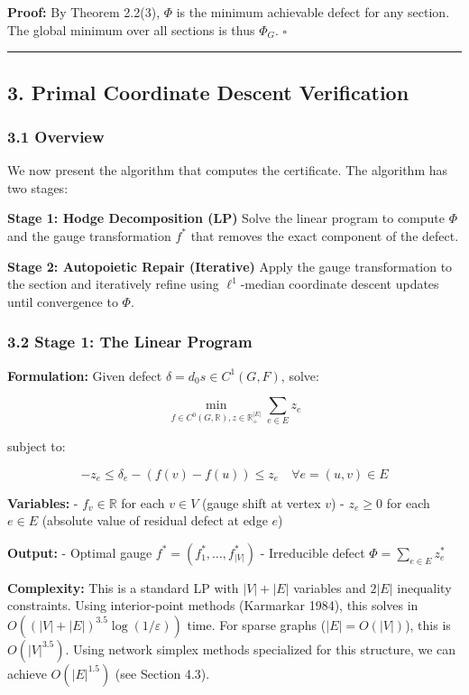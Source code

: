 \documentclass[
]{article}
\begin{document}
\textbf{Proof:} By Theorem 2.2(3), \(\Phi\) is the minimum achievable
defect for any section. The global minimum over all sections is thus
\(\Phi_G\). \(\square\)

\begin{center}\rule{0.5\linewidth}{0.5pt}\end{center}

\subsection{3. Primal Coordinate Descent
Verification}\label{primal-coordinate-descent-verification}

\subsubsection{3.1 Overview}\label{overview}

We now present the algorithm that computes the certificate. The
algorithm has two stages:

\textbf{Stage 1: Hodge Decomposition (LP)} Solve the linear program to
compute \(\Phi\) and the gauge transformation \(f^*\) that removes the
exact component of the defect.

\textbf{Stage 2: Autopoietic Repair (Iterative)} Apply the gauge
transformation to the section and iteratively refine using
\(\ell^1\)-median coordinate descent updates until convergence to
\(\Phi\).

\subsubsection{3.2 Stage 1: The Linear
Program}\label{stage-1-the-linear-program}

\textbf{Formulation:} Given defect \(\delta = d_0 s \in C^1(G, F)\),
solve:

\[\min_{f \in C^0(G, \mathbb{R}), z \in \mathbb{R}^{|E|}_+} \sum_{e \in E} z_e\]

subject to:

\[-z_e \leq \delta_e - (f(v) - f(u)) \leq z_e \quad \forall e = (u, v) \in E\]

\textbf{Variables:} - \(f_v \in \mathbb{R}\) for each \(v \in V\) (gauge
shift at vertex \(v\)) - \(z_e \geq 0\) for each \(e \in E\) (absolute
value of residual defect at edge \(e\))

\textbf{Output:} - Optimal gauge \(f^* = (f^*_1, \ldots, f^*_{|V|})\) -
Irreducible defect \(\Phi = \sum_{e \in E} z^*_e\)

\textbf{Complexity:} This is a standard LP with \(|V| + |E|\) variables
and \(2|E|\) inequality constraints. Using interior-point methods
(Karmarkar 1984), this solves in
\(O((|V| + |E|)^{3.5} \log(1/\varepsilon))\) time. For sparse graphs
(\(|E| = O(|V|)\)), this is \(O(|V|^{3.5})\). Using network simplex
methods specialized for this structure, we can achieve \(O(|E|^{1.5})\)
(see Section 4.3).
\end{document}
